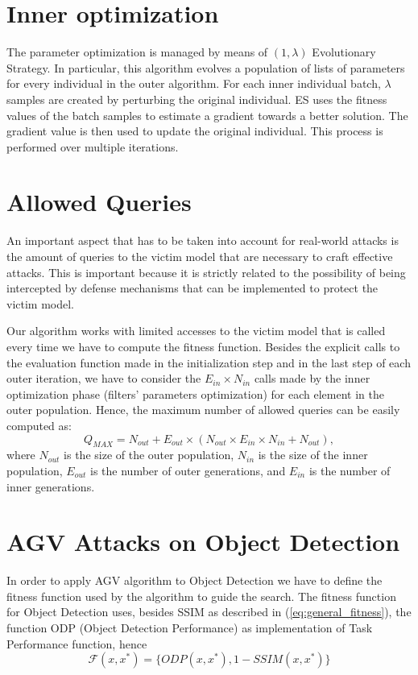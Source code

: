 \section{Inner optimization}

The parameter optimization is managed by means of $(1,\lambda) $ Evolutionary Strategy.
In particular, this algorithm evolves a population of lists of parameters for every individual in the outer algorithm. For each inner individual batch, $\lambda$ samples are created by perturbing the original individual. ES uses the fitness values of the batch samples  to estimate a gradient towards a better solution.  The gradient value is then used to update the original individual. This  process is performed over multiple iterations. 

\section{Allowed Queries}
An important aspect that has to be taken into account 
for real-world attacks is the amount of queries to the victim model that are necessary to craft effective attacks.
This is important because it is strictly related to the possibility of being intercepted by defense mechanisms that can be implemented to protect the victim model.

Our algorithm works with limited accesses to the victim model that is called every time we have to compute the fitness function. Besides the explicit calls to the evaluation function made in the initialization step and in the last step of each outer iteration, we have to consider the $E_{in}\times N_{in} $ calls made by the inner optimization phase (filters' parameters optimization) for each element in the outer population. 
Hence, the maximum number of allowed queries can be easily computed as: 
\begin{equation} \label{eq:queries}
   Q_{MAX} =  N_{out} + E_{out} \times ( N_{out} \times  E_{in} \times N_{in} + N_{out}),
\end{equation}
where $N_{out}$ is the size of the outer population, $N_{in}$ is the size of the inner population, $E_{out}$  is the number of outer generations, and $E_{in}$ is the  number of inner generations.





\section{AGV Attacks on Object Detection} \label{sec:objdet} 
In order to apply AGV algorithm to Object Detection we have to define the fitness function used by the algorithm to guide the search.
The fitness function for Object Detection uses, besides SSIM as described in (\ref{eq:general_fitness}), the function ODP (Object Detection Performance) as implementation of Task Performance function, hence
$$\mathcal{F}(x,x^*) = \{ ODP(x,x^*), 1-SSIM(x, x^*)\}$$


